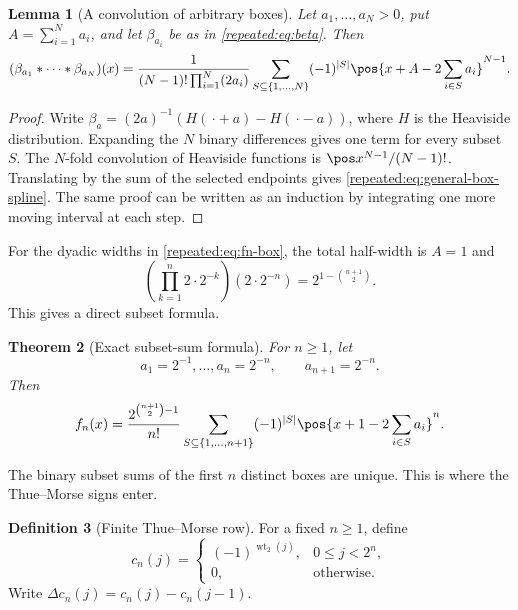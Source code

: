\documentclass[11pt,oneside]{article}
\newtheorem{theorem}{Theorem}[section]
\newtheorem{lemma}[theorem]{Lemma}
\theoremstyle{definition}
\newtheorem{definition}[theorem]{Definition}
\theoremstyle{remark}
\newcommand{\wt}{\operatorname{wt}_2}
\begin{document}
\begin{lemma}[A convolution of arbitrary boxes]
\label{repeated:lem:general-box-spline}
Let $a_1,\ldots,a_N>0$, put $A=\sum_{i=1}^{N}a_i$, and let
$\beta_{a_i}$ be as in \eqref{repeated:eq:beta}.  Then
\begin{equation}
 (\beta_{a_1}*\cdots*\beta_{a_N})(x)
 =\frac{1}{(N-1)!\prod_{i=1}^{N}(2a_i)}
 \sum_{S\subseteq\{1,\ldots,N\}}(-1)^{|S|}
 \pos{x+A-2\sum_{i\in S}a_i}^{N-1}.                       \label{repeated:eq:general-box-spline}
\end{equation}
\end{lemma}

\begin{proof}
Write
$\beta_a=(2a)^{-1}(H(\,\boldsymbol\cdot+a)-H(\,\boldsymbol\cdot-a))$, where $H$ is the
Heaviside distribution.  Expanding the $N$ binary differences gives one term for every
subset $S$.  The $N$-fold convolution of Heaviside functions is
$\pos x^{N-1}/(N-1)!$.  Translating by the sum of the selected endpoints gives
\eqref{repeated:eq:general-box-spline}.  The same proof can be written as an induction by integrating
one more moving interval at each step.
\end{proof}

For the dyadic widths in \eqref{repeated:eq:fn-box}, the total half-width is $A=1$ and
\begin{equation}
 \left(\prod_{k=1}^{n}2\cdot2^{-k}\right)(2\cdot2^{-n})
 =2^{1-\binom{n+1}{2}}.                                    \label{repeated:eq:normalization-product}
\end{equation}
This gives a direct subset formula.

\begin{theorem}[Exact subset-sum formula]
\label{repeated:thm:subset-formula}
For $n\ge1$, let
\[
 a_1=2^{-1},\ldots,a_n=2^{-n},\qquad a_{n+1}=2^{-n}.
\]
Then
\begin{equation}
 f_n(x)=\frac{2^{\binom{n+1}{2}-1}}{n!}
 \sum_{S\subseteq\{1,\ldots,n+1\}}(-1)^{|S|}
 \pos{x+1-2\sum_{i\in S}a_i}^{n}.                         \label{repeated:eq:subset-formula}
\end{equation}
\end{theorem}

The binary subset sums of the first $n$ distinct boxes are unique.  This is where the
Thue--Morse signs enter.

\begin{definition}[Finite Thue--Morse row]
For a fixed $n\ge1$, define
\begin{equation}
 c_n(j)=
 \begin{cases}
  (-1)^{\wt(j)},&0\le j<2^n,\\
  0,&\text{otherwise}.
 \end{cases}                                                \label{repeated:eq:cn}
\end{equation}
Write $\Delta c_n(j)=c_n(j)-c_n(j-1)$.
\end{definition}
\end{document}
